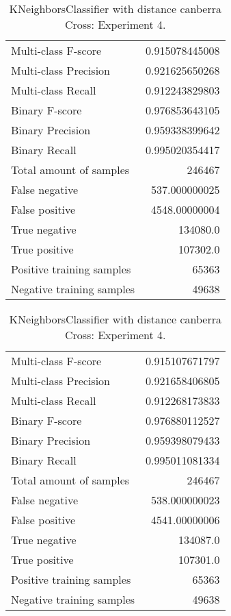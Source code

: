 \begin{table}[H]
\begin{minipage}{0.5\textwidth}
\caption{KNeighborsClassifier with distance canberra Cross: Experiment 3.}
\centering
\begin{tabular}{l r}
\toprule
Multi-class F-score & 0.915078445008 \\
Multi-class Precision & 0.921625650268 \\
Multi-class Recall & 0.912243829803 \\
\midrule
Binary F-score & 0.976853643105 \\
Binary Precision & 0.959338399642 \\
Binary Recall & 0.995020354417 \\
\midrule
Total amount of samples & 246467 \\
False negative & 537.000000025 \\
False positive & 4548.00000004 \\
True negative & 134080.0 \\
True positive & 107302.0 \\
\midrule
Positive training samples & 65363 \\
Negative training samples & 49638 \\
\bottomrule
\end{tabular}
\end{minipage}
\hfillx
\begin{minipage}{0.5\textwidth}
\caption{KNeighborsClassifier with distance canberra Cross: Experiment 4.}
\centering
\begin{tabular}{l r}
\toprule
Multi-class F-score & 0.915107671797 \\
Multi-class Precision & 0.921658406805 \\
Multi-class Recall & 0.912268173833 \\
\midrule
Binary F-score & 0.976880112527 \\
Binary Precision & 0.959398079433 \\
Binary Recall & 0.995011081334 \\
\midrule
Total amount of samples & 246467 \\
False negative & 538.000000023 \\
False positive & 4541.00000006 \\
True negative & 134087.0 \\
True positive & 107301.0 \\
\midrule
Positive training samples & 65363 \\
Negative training samples & 49638 \\
\bottomrule
\end{tabular}
\end{minipage}
\end{table}
